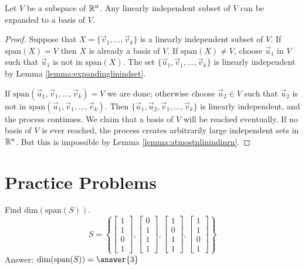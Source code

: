 \documentclass{ximera}
\begin{document}
\begin{theorem}\label{th:expandtobasis}
Let $V$ be a subspace of $\mathbb{R}^n$.  Any linearly independent subset of $V$ can be expanded to a basis of $V$.
\end{theorem}
\begin{proof}
Suppose that $X=\{\vec{v}_1,\ldots ,\vec{v}_k\}$ is a linearly independent subset of $V$. If $\mbox{span}(X) = V$ then $X$ is already a basis of $V$. If $\mbox{span}(X) \neq V$, choose $\vec{u}_1$ in $V$ such that $\vec{u}_1$ is not in $\mbox{span}(X)$. The set $\{\vec{u}_1, \vec{v}_1,\ldots ,\vec{v}_k\}$ is linearly independent by Lemma \ref{lemma:expandinglinindset}. 

If $\mbox{span}(\vec{u}_1, \vec{v}_1,\ldots ,\vec{v}_k) = V$ we are done; otherwise choose $\vec{u}_{2} \in V$ such that $\vec{u}_{2}$ is not in $\mbox{span}(\vec{u}_1, \vec{v}_1,\ldots ,\vec{v}_k)$. Then $\{\vec{u}_1,\vec{u}_2, \vec{v}_1,\ldots ,\vec{v}_k\}$ is linearly independent, and the process continues. We claim that a basis of $V$ will be reached eventually. If no basis of $V$ is ever reached, the process creates arbitrarily large independent sets in $\mathbb{R}^n$. But this is impossible by Lemma \ref{lemma:atmostnlinindinrn}.
\end{proof}

\section*{Practice Problems}



\begin{problem}\label{prob:finddimension1}
Find $\mbox{dim}(\mbox{span}(S))$.
$$S=\left\{\begin{bmatrix}1\\1\\0\\1\end{bmatrix}, \begin{bmatrix}0\\1\\1\\1\end{bmatrix}, \begin{bmatrix}1\\0\\1\\1\end{bmatrix}, \begin{bmatrix}1\\1\\0\\1\end{bmatrix} \right\}$$
Answer: $\mbox{dim}(\mbox{span}(S))=\answer{3}$
\end{problem}
\end{document}

